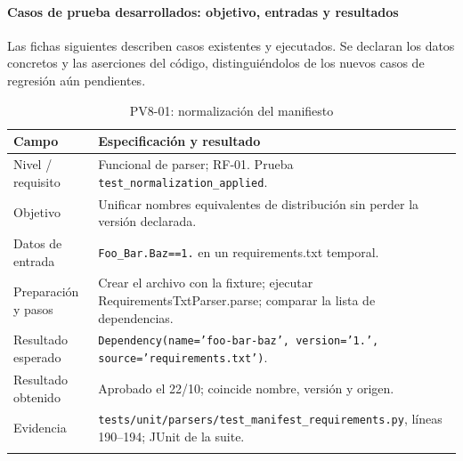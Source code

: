 \paragraph*{Casos de prueba desarrollados: objetivo, entradas y resultados}
Las fichas siguientes describen casos existentes y ejecutados. Se declaran los datos concretos y las aserciones del código, distinguiéndolos de los nuevos casos de regresión aún pendientes.
\begin{table}[H]
\centering\small{}
\caption{PV8-01: normalización del manifiesto}
\begin{tabularx}{\textwidth}{P{3.5cm}Y}
\toprule
\textbf{Campo} & \textbf{Especificación y resultado} \\
\midrule
Nivel / requisito & Funcional de parser; RF-01. Prueba \texttt{test\_\allowbreak normalization\_\allowbreak applied}. \\
\addlinespace
Objetivo & Unificar nombres equivalentes de distribución sin perder la versión declarada. \\
\addlinespace
Datos de entrada & \texttt{Foo\_\allowbreak Bar.\allowbreak Baz==1.} en un requirements.txt temporal. \\
\addlinespace
Preparación y pasos & Crear el archivo con la fixture; ejecutar RequirementsTxtParser.parse; comparar la lista de dependencias. \\
\addlinespace
Resultado esperado & \texttt{Dependency(name='foo-\allowbreak bar-\allowbreak baz', version='1.', source='requirements.\allowbreak txt')}. \\
\addlinespace
Resultado obtenido & Aprobado el 22/10; coincide nombre, versión y origen. \\
\addlinespace
Evidencia & \texttt{tests/\allowbreak unit/\allowbreak parsers/\allowbreak test\_\allowbreak manifest\_\allowbreak requirements.\allowbreak py}, líneas 190--194; JUnit de la suite. \\
\addlinespace
\bottomrule
\end{tabularx}
\end{table}
